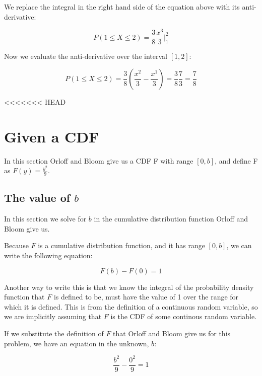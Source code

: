 \documentclass[a4paper,11pt]{article}
\begin{document}
We replace the integral in the right hand side of the equation above with its
anti-derivative:

\begin{equation}
P \left( 1 \leq X \leq 2 \right) = \frac{3}{8} \frac{x^{3}}{3} \bigg\rvert_{1}^{2}
\end{equation}

Now we evaluate the anti-derivative over the interval $\left[ 1, 2 \right]$:

\begin{equation}
P \left( 1 \leq X \leq 2 \right)
  = \frac{3}{8} \left( \frac{x^{2}}{3} - \frac{x^{1}}{3} \right)
  = \frac{3}{8} \frac{7}{3}
  = \frac{7}{8}
\end{equation}

<<<<<<< HEAD
\section{Given a CDF}

In this section Orloff and Bloom give us a CDF F with range
$\left[ 0, b \right]$, and define F as $F\left( y \right) = \frac{y^{2}}{9}$.

\subsection{The value of $b$}

In this section we solve for $b$ in the cumulative distribution function Orloff
and Bloom give us.

Because $F$ is a cumulative distribution function, and it has range
$\left[ 0, b \right]$, we can write the following equation:

\begin{equation}
    F \left(b \right) - F\left(0 \right) = 1
\end{equation}

Another way to write this is that we know the integral of the probability
density function that $F$ is defined to be, must have the value of 1 over
the range for which it is defined.  This is from the definition of a continuous
random variable, so we are implicitly assuming that $F$ is the CDF of some
continous random variable.

If we substitute the definition of $F$ that Orloff and Bloom give us for this
problem, we have an equation in the unknown, $b$:

\begin{equation}
  \frac{b^{2}}{9} - \frac{0^{2}}{9} = 1
\end{equation}
\end{document}
